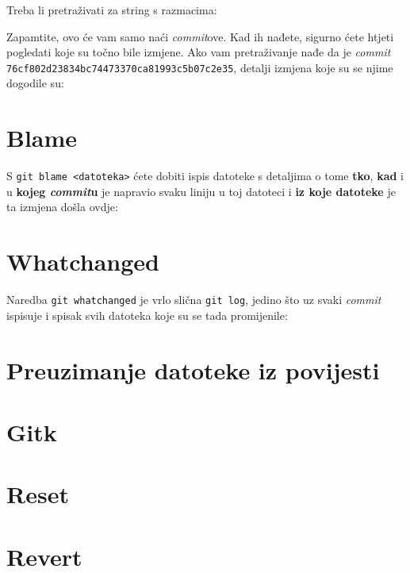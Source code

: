 
Treba li pretraživati za string s razmacima:


Zapamtite, ovo će vam samo naći \emph{commit}ove.
Kad ih nađete, sigurno ćete htjeti pogledati koje su točno bile izmjene.
Ako vam pretraživanje nađe da je \emph{commit} \verb+76cf802d23834bc74473370ca81993c5b07c2e35+, detalji izmjena koje su se njime dogodile su:


\section*{Blame}

S \verb+git blame <datoteka>+ ćete dobiti ispis datoteke s detaljima o tome \textbf{tko}, \textbf{kad} i u \textbf{kojeg \emph{commit}u} je napravio svaku liniju u toj datoteci i \textbf{iz koje datoteke} je ta izmjena došla ovdje:



\section*{Whatchanged}

Naredba \verb+git whatchanged+ je vrlo slična \verb+git log+, jedino što uz svaki \emph{commit} ispisuje i spisak svih datoteka koje su se tada promijenile:



\section*{Preuzimanje datoteke iz povijesti}

\section*{Gitk}

\section*{Reset}

\section*{Revert}

